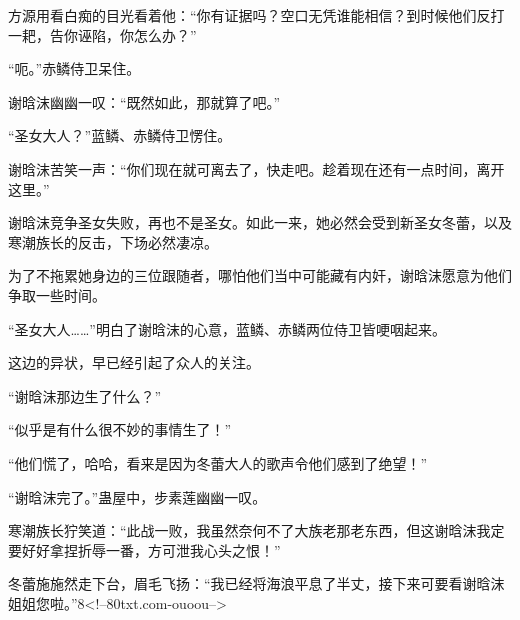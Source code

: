 \begin{this_body}
方源用看白痴的目光看着他：“你有证据吗？空口无凭谁能相信？到时候他们反打一耙，告你诬陷，你怎么办？”

“呃。”赤鳞侍卫呆住。

谢晗沫幽幽一叹：“既然如此，那就算了吧。”

“圣女大人？”蓝鳞、赤鳞侍卫愣住。

谢晗沫苦笑一声：“你们现在就可离去了，快走吧。趁着现在还有一点时间，离开这里。”

谢晗沫竞争圣女失败，再也不是圣女。如此一来，她必然会受到新圣女冬蕾，以及寒潮族长的反击，下场必然凄凉。

为了不拖累她身边的三位跟随者，哪怕他们当中可能藏有内奸，谢晗沫愿意为他们争取一些时间。

“圣女大人……”明白了谢晗沫的心意，蓝鳞、赤鳞两位侍卫皆哽咽起来。

这边的异状，早已经引起了众人的关注。

“谢晗沫那边生了什么？”

“似乎是有什么很不妙的事情生了！”

“他们慌了，哈哈，看来是因为冬蕾大人的歌声令他们感到了绝望！”

“谢晗沫完了。”蛊屋中，步素莲幽幽一叹。

寒潮族长狞笑道：“此战一败，我虽然奈何不了大族老那老东西，但这谢晗沫我定要好好拿捏折辱一番，方可泄我心头之恨！”

冬蕾施施然走下台，眉毛飞扬：“我已经将海浪平息了半丈，接下来可要看谢晗沫姐姐您啦。”8<!--80txt.com-ouoou-->

\end{this_body}

